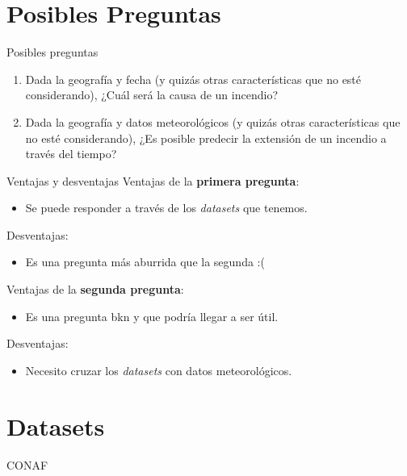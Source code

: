 \section{Posibles Preguntas}
\begin{frame}{Posibles preguntas}
    \begin{enumerate}
        \item Dada la geografía y fecha (y quizás otras características que no esté considerando), ¿Cuál será la causa de un incendio? 
        \item Dada la geografía y datos meteorológicos (y quizás otras características que no esté considerando), ¿Es posible predecir la extensión de un incendio a través del tiempo?
    \end{enumerate}
\end{frame}

\begin{frame}{Ventajas y desventajas}
    Ventajas de la \textbf{primera pregunta}:
    \begin{itemize}
        \item[\ding{51}] Se puede responder a través de los \textit{datasets} que tenemos.
    \end{itemize}
    Desventajas:
    \begin{itemize}
        \item[\ding{55}] Es una pregunta más aburrida que la segunda :(
    \end{itemize}
    
    Ventajas de la \textbf{segunda pregunta}:
    \begin{itemize}
        \item[\ding{51}] Es una pregunta bkn y que podría llegar a ser útil.
    \end{itemize}
    Desventajas:
    \begin{itemize}
        \item[\ding{55}] Necesito cruzar los \textit{datasets} con datos meteorológicos.
    \end{itemize}
\end{frame}

\section{Datasets}
\begin{frame}{CONAF}
\end{frame}

